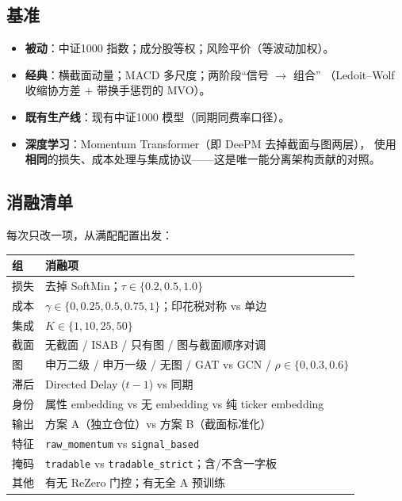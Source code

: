 \documentclass[11pt, a4paper]{ctexart}
\newcommand{\file}[1]{\texttt{\small #1}}
\begin{document}
\subsection{基准}
\begin{itemize}
  \item \textbf{被动}：中证1000 指数；成分股等权；风险平价（等波动加权）。
  \item \textbf{经典}：横截面动量；MACD 多尺度；两阶段“信号 $\to$ 组合”
        （Ledoit--Wolf 收缩协方差 $+$ 带换手惩罚的 MVO）。
  \item \textbf{既有生产线}：现有中证1000 模型（同期同费率口径）。
  \item \textbf{深度学习}：Momentum Transformer（即 DeePM 去掉截面与图两层），
        使用\textbf{相同}的损失、成本处理与集成协议——这是唯一能分离架构贡献的对照。
\end{itemize}

\subsection{消融清单}
每次只改一项，从满配配置出发：

\begin{table}[h]
\centering
\small
\begin{tabular}{lp{8.4cm}}
\toprule
组 & 消融项 \\
\midrule
损失 & 去掉 SoftMin；$\tau\in\{0.2,0.5,1.0\}$ \\
成本 & $\gamma\in\{0,0.25,0.5,0.75,1\}$；印花税对称 vs 单边 \\
集成 & $K\in\{1,10,25,50\}$ \\
截面 & 无截面 / ISAB / 只有图 / 图与截面顺序对调 \\
图 & 申万二级 / 申万一级 / 无图 / GAT vs GCN / $\rho\in\{0,0.3,0.6\}$ \\
滞后 & Directed Delay ($t{-}1$) vs 同期 \\
身份 & 属性 embedding vs 无 embedding vs 纯 ticker embedding \\
输出 & 方案 A（独立仓位）vs 方案 B（截面标准化） \\
特征 & \texttt{raw\_momentum} vs \texttt{signal\_based} \\
掩码 & \file{tradable} vs \file{tradable\_strict}；含/不含一字板 \\
其他 & 有无 ReZero 门控；有无全 A 预训练 \\
\bottomrule
\end{tabular}
\end{table}

\end{document}
